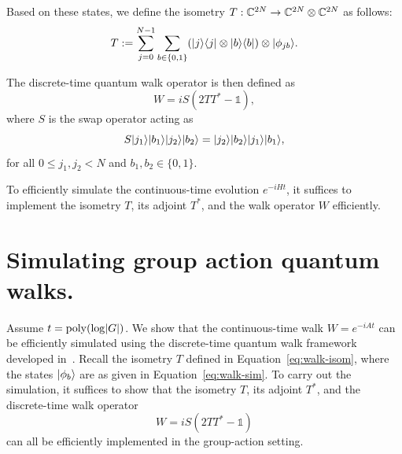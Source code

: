 \documentclass[12pt]{report}
\begin{document}
Based on these states, we define the isometry \( T : \mathbb{C}^{2N} \to \mathbb{C}^{2N} \otimes \mathbb{C}^{2N} \) as follows:
\begin{equation}
    \label{eq:walk-isom}
    T := \sum_{j = 0}^{N - 1} \sum_{b \in \{0, 1\}} (\lvert j\rangle\langle j\rvert \otimes \lvert b\rangle\langle b\rvert) \otimes \lvert\phi_{jb}\rangle.
\end{equation}

The discrete-time quantum walk operator is then defined as
\[
W = iS(2TT^* - \mathds{1}),
\]
where \( S \) is the swap operator acting as
\[
S \lvert j_1\rangle \lvert b_1\rangle \lvert j_2\rangle \lvert b_2\rangle = \lvert j_2\rangle \lvert b_2\rangle \lvert j_1\rangle \lvert b_1\rangle,
\]
for all \( 0 \le j_1, j_2 < N \) and \( b_1, b_2 \in \{0, 1\} \).

To efficiently simulate the continuous-time evolution \( e^{-iHt} \), it suffices to implement the isometry \( T \), its adjoint \( T^* \), and the walk operator \( W \) efficiently.








\section{Simulating group action quantum walks.}
Assume \( t = \operatorname{poly}(\log \lvert G\rvert) \). We show that the continuous-time walk \( W = e^{-iAt} \) can be efficiently simulated using the discrete-time quantum walk framework developed in~\cite{childs2010relationship}. Recall the isometry \( T \) defined in Equation~\eqref{eq:walk-isom}, where the states \( \lvert\phi_b\rangle \) are as given in Equation~\eqref{eq:walk-sim}. To carry out the simulation, it suffices to show that the isometry \( T \), its adjoint \( T^* \), and the discrete-time walk operator
\[
W = iS(2TT^* - \mathds{1})
\]
can all be efficiently implemented in the group-action setting.
\end{document}

